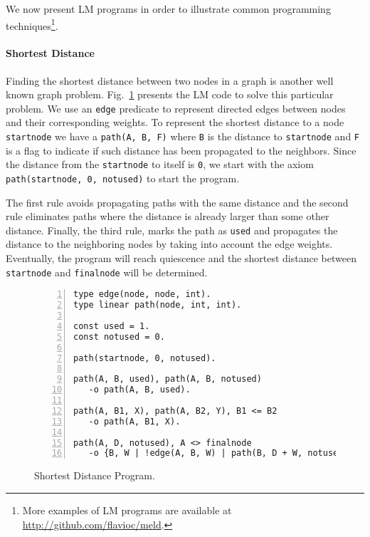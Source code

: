
We now present LM programs in order to illustrate common programming techniques\footnote{More examples of LM programs are available at \url{http://github.com/flavioc/meld}.}.

\paragraph{Shortest Distance}

Finding the shortest distance between two nodes in a graph is another well known graph problem.
Fig.~\ref{code:shortest_path} presents the LM code to solve this particular problem.
We use an \texttt{edge}
predicate to represent directed edges between nodes and their corresponding weights. To represent the shortest
distance to a node \texttt{startnode} we have a \texttt{path(A, B, F)} where \texttt{B} is the distance to \texttt{startnode}
and \texttt{F} is a flag to indicate if such distance has been propagated to the neighbors. Since the distance from
the \texttt{startnode} to itself is \texttt{0}, we start with the axiom \texttt{path(startnode, 0, notused)} to start the program.

The first rule avoids propagating paths with the same distance and the second rule eliminates paths where the distance
is already larger than some other distance. Finally, the third rule, marks the path as \texttt{used} and propagates
the distance to the neighboring nodes by taking into account the edge weights.
Eventually, the program will reach quiescence and the shortest distance between \texttt{startnode} and \texttt{finalnode}
will be determined.

\begin{figure}[h!]
\footnotesize\begin{Verbatim}[numbers=left]
type edge(node, node, int).
type linear path(node, int, int).

const used = 1.
const notused = 0.

path(startnode, 0, notused).

path(A, B, used), path(A, B, notused)
   -o path(A, B, used).

path(A, B1, X), path(A, B2, Y), B1 <= B2
   -o path(A, B1, X).

path(A, D, notused), A <> finalnode
   -o {B, W | !edge(A, B, W) | path(B, D + W, notused)}, path(A, D, used).
\end{Verbatim}
\caption{Shortest Distance Program.}
\label{code:shortest_path}
\end{figure}
\normalsize

